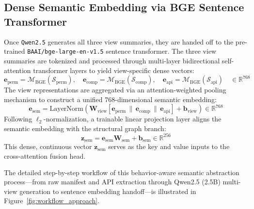 \documentclass[12pt,a4paper,oneside]{report}
\begin{document}
\subsection{Dense Semantic Embedding via BGE Sentence Transformer}
Once \texttt{Qwen2.5} generates all three view summaries, they are handed off to the pre-trained \texttt{BAAI/bge-large-en-v1.5} sentence transformer. The three view summaries are tokenized and processed through multi-layer bidirectional self-attention transformer layers to yield view-specific dense vectors:
\begin{equation}
    \mathbf{e}_{\text{perm}} = \mathcal{M}_{\text{BGE}}(\mathcal{S}_{\text{perm}}), \quad
    \mathbf{e}_{\text{comp}} = \mathcal{M}_{\text{BGE}}(\mathcal{S}_{\text{comp}}), \quad
    \mathbf{e}_{\text{api}} = \mathcal{M}_{\text{BGE}}(\mathcal{S}_{\text{api}}) \quad \in \mathbb{R}^{768}
\end{equation}
The view representations are aggregated via an attention-weighted pooling mechanism to construct a unified 768-dimensional semantic embedding:
\begin{equation}
    \mathbf{e}_{\text{sem}} = \text{LayerNorm}\left(\mathbf{W}_{\text{view}} [\mathbf{e}_{\text{perm}} \,\|\, \mathbf{e}_{\text{comp}} \,\|\, \mathbf{e}_{\text{api}}] + \mathbf{b}_{\text{view}}\right) \in \mathbb{R}^{768}
\end{equation}
Following $\ell_2$-normalization, a trainable linear projection layer aligns the semantic embedding with the structural graph branch:
\begin{equation}
    \mathbf{z}_{\text{sem}} = \mathbf{e}_{\text{sem}} \mathbf{W}_{\text{sem}} + \mathbf{b}_{\text{sem}} \in \mathbb{R}^{256}
\end{equation}
This dense, continuous vector $\mathbf{z}_{\text{sem}}$ serves as the key and value inputs to the cross-attention fusion head.

The detailed step-by-step workflow of this behavior-aware semantic abstraction process—from raw manifest and API extraction through Qwen2.5 (2.5B) multi-view generation to sentence embedding handoff—is illustrated in Figure~\ref{fig:workflow_approach}.
\end{document}

